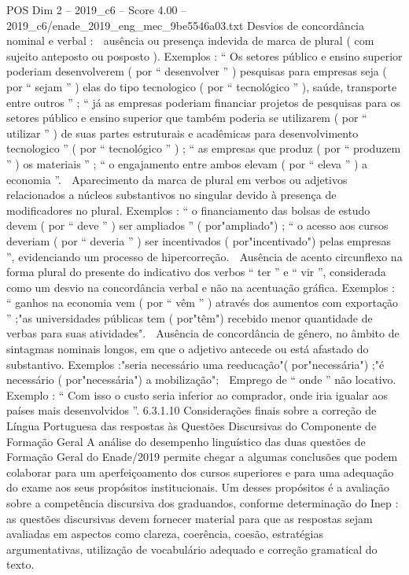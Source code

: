 \begin{textsample}{POS Dim 2 – 2019\_c6 – Score 4.00 – 2019\_c6/enade\_2019\_eng\_mec\_9be5546a03.txt}
Desvios de concordância nominal e verbal :  ausência ou presença indevida de marca de plural ( com sujeito anteposto ou posposto ).
Exemplos : “ Os setores público e ensino superior poderiam desenvolverem ( por “ desenvolver ” ) pesquisas para empresas seja ( por “ sejam ” ) elas do tipo tecnologico ( por “ tecnológico ” ), saúde, transporte entre outros ” ; “ já as empresas poderiam financiar projetos de pesquisas para os setores público e ensino superior que também poderia se utilizarem ( por “ utilizar ” ) de suas partes estruturais e acadêmicas para desenvolvimento tecnologico ” ( por “ tecnológico ” ) ; “ as empresas que produz ( por “ produzem ” ) os materiais ” ; “ o engajamento entre ambos elevam ( por “ eleva ” ) a economia ”.  Aparecimento da marca de plural em verbos ou adjetivos relacionados a núcleos substantivos no singular devido à presença de modificadores no plural.
Exemplos : “ o financiamento das bolsas de estudo devem ( por “ deve ” ) ser ampliados ” ( por"ampliado") ; “ o acesso aos cursos deveriam ( por “ deveria ” ) ser incentivados ( por"incentivado") pelas empresas ”, evidenciando um processo de hipercorreção.  Ausência de acento circunflexo na forma plural do presente do indicativo dos verbos “ ter ” e “ vir ”, considerada como um desvio na concordância verbal e não na acentuação gráfica.
Exemplos : “ ganhos na economia vem ( por “ vêm ” ) através dos aumentos com exportação ” ;"as universidades públicas tem ( por"têm") recebido menor quantidade de verbas para suas atividades".  Ausência de concordância de gênero, no âmbito de sintagmas nominais longos, em que o adjetivo antecede ou está afastado do substantivo.
Exemplos :"seria necessário uma reeducação"( por"necessária") ;"é necessário ( por"necessária") a mobilização";  Emprego de “ onde ” não locativo.
Exemplo : “ Com isso o custo seria inferior ao comprador, onde iria igualar aos países mais desenvolvidos ”. 6.3.1.10 Considerações finais sobre a correção de Língua Portuguesa das respostas às Questões Discursivas do Componente de Formação Geral A análise do desempenho linguístico das duas questões de Formação Geral do Enade/2019 permite chegar a algumas conclusões que podem colaborar para um aperfeiçoamento dos cursos superiores e para uma adequação do exame aos seus propósitos institucionais.
Um desses propósitos é a avaliação sobre a competência discursiva dos graduandos, conforme determinação do Inep : as questões discursivas devem fornecer material para que as respostas sejam avaliadas em aspectos como clareza, coerência, coesão, estratégias argumentativas, utilização de vocabulário adequado e correção gramatical do texto.

\end{textsample}

